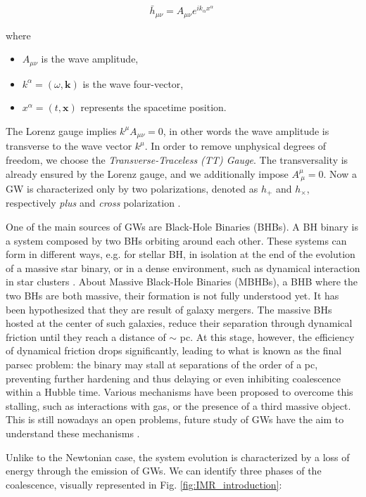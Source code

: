 \begin{equation}
 \bar{h}_{\mu\nu} = A_{\mu\nu} e^{i k_\alpha x^\alpha}  \: 
\end{equation}

\noindent
where 
\begin{itemize}
   \item \( A_{\mu\nu} \) is the wave amplitude,
    \item \( k^\alpha = (\omega, \mathbf{k}) \) is the wave four-vector,
    \item \( x^\alpha = (t, \mathbf{x}) \) represents the spacetime position.
\end{itemize}

The Lorenz gauge implies $ k^\mu A_{\mu\nu} = 0 $, in other words the wave amplitude is transverse to the wave vector \( k^\mu \). In order to remove unphysical degrees of freedom, we choose the \textit{Transverse-Traceless (TT) Gauge}. The transversality is already ensured by the Lorenz gauge, and we additionally impose $ A^\mu_{\ \mu} = 0 $. Now a GW is characterized only by two polarizations, denoted as $ h_{+} $ and $ h_ {\times}$, respectively \textit{plus} and \textit{cross} polarization \cite{Flanagan_2005}.

One of the main sources of GWs are Black-Hole Binaries (BHBs). A BH binary is a system composed by two BHs orbiting around each other. These systems can form in different ways, e.g. for stellar BH, in isolation at the end of the evolution of a massive star binary, or in a dense environment, such as dynamical interaction in star clusters \cite{Mapelli_2020}. About Massive Black-Hole Binaries (MBHBs), a BHB where the two BHs are both massive, their formation is not fully understood yet. It has been hypothesized that they are result of galaxy mergers. The massive BHs hosted at the center of such galaxies, reduce their separation through dynamical friction until they reach a distance of $\sim$ pc. At this stage, however, the efficiency of dynamical friction drops significantly, leading to what is known as the final parsec problem: the binary may stall at separations of the order of a pc, preventing further hardening and thus delaying or even inhibiting coalescence within a Hubble time. Various mechanisms have been proposed to overcome this stalling, such as interactions with gas, or the presence of a third massive object. This is still nowadays an open problems, future study of GWs have the aim to understand these mechanisms \cite{Milosavljevic__2003}.
 
Unlike to the Newtonian case, the system evolution is characterized by a loss of energy through the emission of GWs. We can identify three phases of the coalescence, visually represented in Fig. \ref{fig:IMR_introduction}:

